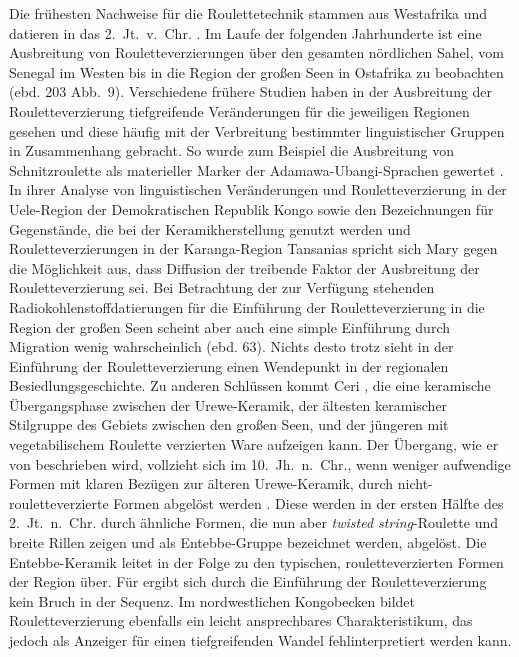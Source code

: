 Die frühesten Nachweise für die Roulettetechnik stammen aus Westafrika und datieren in das 2.~Jt.~v.~Chr. \parencite[189]{LivingstoneSmith.2007}. Im Laufe der folgenden Jahrhunderte ist eine Ausbreitung von Rouletteverzierungen über den gesamten nördlichen Sahel, vom Senegal im Westen bis in die Region der großen Seen in Ostafrika zu beobachten (ebd. 203 Abb.~9). Verschiedene frühere Studien haben in der Ausbreitung der Rouletteverzierung tiefgreifende Veränderungen für die jeweiligen Regionen gesehen und diese häufig mit der Verbreitung bestimmter linguistischer Gruppen in Zusammenhang gebracht. So wurde zum Beispiel die Ausbreitung von Schnitzroulette als materieller Marker der Adamawa-Ubangi-Sprachen gewertet \parencite{David.1977}. In ihrer Analyse von linguistischen Veränderungen und Rouletteverzierung in der Uele-Region der Demokratischen Republik Kongo sowie den Bezeichnungen für Gegenstände, die bei der Keramikherstellung genutzt werden und Rouletteverzierungen in der Karanga-Region Tansanias spricht sich Mary \textcite{McMaster.2005} gegen die Möglichkeit aus, dass Diffusion der treibende Faktor der Ausbreitung der Rouletteverzierung sei. Bei Betrachtung der zur Verfügung stehenden Radiokohlenstoffdatierungen für die Einführung der Rou\-lette\-ver\-zier\-ung in die Region der großen Seen scheint aber auch eine simple Einführung durch Migration wenig wahrscheinlich (ebd. 63). Nichts desto trotz sieht \textcite{McMaster.2005} in der Einführung der Rouletteverzierung einen Wendepunkt in der regionalen Besiedlungsgeschichte. Zu anderen Schlüssen kommt Ceri \textcite{Ashley.2010}, die eine keramische Übergangsphase zwischen der Urewe-Keramik, der ältesten keramischer Stilgruppe des Gebiets zwischen den großen Seen, und der jüngeren mit vegetabilischem Roulette verzierten Ware aufzeigen kann. Der Übergang, wie er von \textcite{Ashley.2010} beschrieben wird, vollzieht sich im 10.~Jh.~n.~Chr., wenn weniger aufwendige Formen mit klaren Bezügen zur älteren Urewe-Keramik, durch nicht-rouletteverzierte Formen abgelöst werden \parencite[890f.]{Reid.2013}. Diese werden in der ersten Hälfte des 2.~Jt.~n.~Chr. durch ähnliche Formen, die nun aber \textit{twisted string}-Roulette und breite Rillen zeigen und als Entebbe-Gruppe bezeichnet werden, abgelöst. Die Entebbe-Keramik leitet in der Folge zu den typischen, rouletteverzierten Formen der Region über. Für \textcite{Ashley.2010} ergibt sich durch die Einführung der Rouletteverzierung kein Bruch in der Sequenz. Im nordwestlichen Kongobecken bildet Rouletteverzierung ebenfalls ein leicht ansprechbares Charakteristikum, das jedoch als Anzeiger für einen tiefgreifenden Wandel fehlinterpretiert werden kann.


